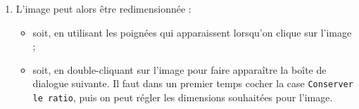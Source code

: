 {\begin{enumerate}
\item L'image peut alors être redimensionnée :
        \begin{itemize}
        \item soit, en utilisant les poignées qui apparaissent lorsqu'on clique sur l'image ;
        \item soit, en double-cliquant sur l'image pour faire apparaître la boîte de dialogue suivante. Il faut dans un premier temps cocher la case \texttt{Conserver le ratio}, puis on peut régler les dimensions souhaitées pour l'image.
        \end{itemize}
\end{enumerate}


}